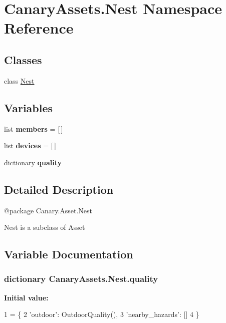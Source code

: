 \hypertarget{namespace_canary_assets_1_1_nest}{\section{Canary\-Assets.\-Nest Namespace Reference}
\label{namespace_canary_assets_1_1_nest}
}
\subsection*{Classes}
\begin{DoxyCompactItemize}
\item 
class \hyperlink{class_canary_assets_1_1_nest_1_1_nest}{Nest}
\end{DoxyCompactItemize}
\subsection*{Variables}
\begin{DoxyCompactItemize}
\item 
\hypertarget{namespace_canary_assets_1_1_nest_a2e64931a173179de2479254126544527}{list {\bfseries members} = \mbox{[}$\,$\mbox{]}}\label{namespace_canary_assets_1_1_nest_a2e64931a173179de2479254126544527}

\item 
\hypertarget{namespace_canary_assets_1_1_nest_ad01b5076589d0887e80c5bfc0faf0cf5}{list {\bfseries devices} = \mbox{[}$\,$\mbox{]}}\label{namespace_canary_assets_1_1_nest_ad01b5076589d0887e80c5bfc0faf0cf5}

\item 
dictionary {\bfseries quality}
\end{DoxyCompactItemize}


\subsection{Detailed Description}
\begin{DoxyVerb}@package Canary.Asset.Nest

Nest is a subclass of Asset
\end{DoxyVerb}
 

\subsection{Variable Documentation}
\hypertarget{namespace_canary_assets_1_1_nest_ab47513933198fdd0489b9ad3bdb169b0}{
\subsubsection[{quality}]{\setlength{\rightskip}{0pt plus 5cm}dictionary Canary\-Assets.\-Nest.\-quality}}\label{namespace_canary_assets_1_1_nest_ab47513933198fdd0489b9ad3bdb169b0}
{\bfseries Initial value\-:}
\begin{DoxyCode}
1 = \{
2     \textcolor{stringliteral}{'outdoor'}: OutdoorQuality(),
3     \textcolor{stringliteral}{'nearby\_hazards'}: []
4 \}
\end{DoxyCode}
